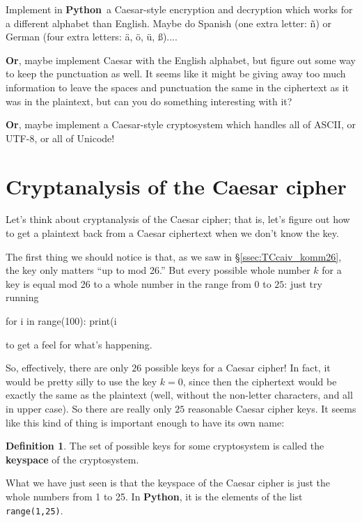 \documentclass[12pt,letterpaper]{amsbook}
\theoremstyle{definition}
\newtheorem{definition}[theorem]{Definition}
\theoremstyle{remark}
\numberwithin{figure}{section}
\numberwithin{exercise}{chapter}
\numberwithin{section}{chapter}
\numberwithin{equation}{section}
\numberwithin{table}{subsection}
\newcommand{\code}[1]{\colorbox{lg}{\texttt{#1}}}
\newcommand{\Python}{{\textbf{\ix{Python}}}}
\newcommand{\ix}[1]{{#1}\index{#1}}
\begin{document}
\vskip2mm
\begin{BTtcb}[label=bt:generalizedCaesar]{}{}
  Implement in \Python\ a Caesar-style encryption and decryption which works
  for a different alphabet than English.  Maybe do Spanish (one extra letter:
  \~n) or German (four extra letters: \"a, \"o, \"u, \ss)....

  \textbf{Or}, maybe implement Caesar with the English alphabet, but figure
  out some way to keep the punctuation as well.  It seems like it might be
  giving away too much information to leave the spaces and punctuation the
  same in the ciphertext as it was in the plaintext, but can you do something
  interesting with it?

  \textbf{Or}, maybe implement a Caesar-style cryptosystem which handles all
  of ASCII, or UTF-8, or all of Unicode!
\end{BTtcb}

\vfill
\pagebreak
\section{Cryptanalysis of the Caesar cipher}\label{sec:CotCc}

Let's think about cryptanalysis of the Caesar cipher; that is, let's figure
out how to get a plaintext back from a Caesar ciphertext when we don't know
the key.

The first thing we should notice is that, as we saw in
\S\ref{ssec:TCcaiv_komm26}, the key only matters ``up to mod 26.''  But every
possible whole number $k$ for a key is equal mod 26 to a whole number in the
range from $0$ to $25$: just try running\\
\begin{codedisp}
  for i in range(100):
    print(i%
\end{codedisp}

\noindent to get a feel for what's happening.

So, effectively, there are only $26$ possible keys for a Caesar cipher!  In
fact, it would be pretty silly to use the key $k=0$, since then the ciphertext
would be exactly the same as the plaintext (well, without the non-letter
characters, and all in upper case).  So there are really only $25$ reasonable
Caesar cipher keys.  It seems like this kind of thing is important enough to
have its own name:
\begin{definition}
  \label{def:keyspace}
  The set of possible keys for some cryptosystem is called the \textbf{keyspace}
  of the cryptosystem.
\end{definition}
What we have just seen is that the keyspace of the Caesar cipher is just the
whole numbers from 1 to 25.  In \Python, it is the elements of the list
\code{range(1,25)}.
\end{document}
